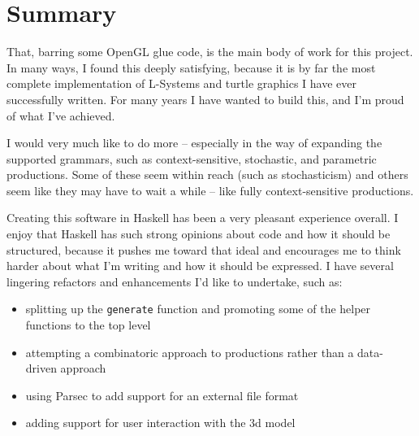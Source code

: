 \documentclass[]{article}
\newenvironment{Shaded}{}{}
\newcommand{\KeywordTok}[1]{\textcolor[rgb]{0.00,0.44,0.13}{\textbf{{#1}}}}
\newcommand{\DataTypeTok}[1]{\textcolor[rgb]{0.56,0.13,0.00}{{#1}}}
\newcommand{\DecValTok}[1]{\textcolor[rgb]{0.25,0.63,0.44}{{#1}}}
\newcommand{\FloatTok}[1]{\textcolor[rgb]{0.25,0.63,0.44}{{#1}}}
\newcommand{\OtherTok}[1]{\textcolor[rgb]{0.00,0.44,0.13}{{#1}}}
\newcommand{\FunctionTok}[1]{\textcolor[rgb]{0.02,0.16,0.49}{{#1}}}
\newcommand{\NormalTok}[1]{{#1}}
\begin{document}
\begin{Shaded}
\end{Shaded}
\section{Summary}

That, barring some OpenGL glue code, is the main body of work for this
project. In many ways, I found this deeply satisfying, because it is by
far the most complete implementation of L-Systems and turtle graphics I
have ever successfully written. For many years I have wanted to build
this, and I'm proud of what I've achieved.

I would very much like to do more -- especially in the way of expanding
the supported grammars, such as context-sensitive, stochastic, and
parametric productions. Some of these seem within reach (such as
stochasticism) and others seem like they may have to wait a while --
like fully context-sensitive productions.

Creating this software in Haskell has been a very pleasant experience
overall. I enjoy that Haskell has such strong opinions about code and
how it should be structured, because it pushes me toward that ideal and
encourages me to think harder about what I'm writing and how it should
be expressed. I have several lingering refactors and enhancements I'd
like to undertake, such as:

\begin{itemize}
\item
  splitting up the \texttt{generate} function and promoting some of the
  helper functions to the top level
\item
  attempting a combinatoric approach to productions rather than a data-
  driven approach
\item
  using Parsec to add support for an external file format
\item
  adding support for user interaction with the 3d model
\end{itemize}
\end{document}
